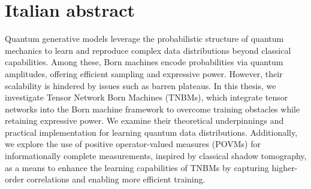 \chapter*{Italian abstract}
Quantum generative models leverage the probabilistic structure of quantum mechanics to learn and reproduce complex data distributions beyond classical capabilities. Among these, Born machines encode probabilities via quantum amplitudes, offering efficient sampling and expressive power. However, their scalability is hindered by issues such as barren plateaus. In this thesis, we investigate Tensor Network Born Machines (TNBMs), which integrate tensor networks into the Born machine framework to overcome training obstacles while retaining expressive power. We examine their theoretical underpinnings and practical implementation for learning quantum data distributions. Additionally, we explore the use of positive operator-valued measures (POVMs) for informationally complete measurements, inspired by classical shadow tomography, as a means to enhance the learning capabilities of TNBMs by capturing higher-order correlations and enabling more efficient training.
